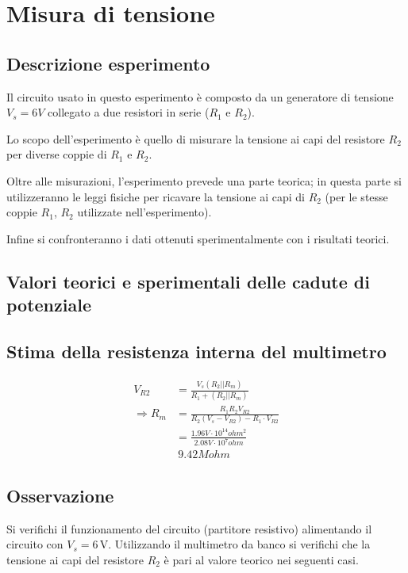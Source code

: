 \documentclass{article}
\begin{document}
\section{Misura di tensione}

\subsection{Descrizione esperimento}
Il circuito usato in questo esperimento è composto da un generatore di tensione \(V_s=6 V\)
collegato a due resistori in serie (\(R_1\) e \(R_2\)).

Lo scopo dell'esperimento è quello di misurare la tensione ai capi del resistore \(R_2\)
per diverse coppie di \(R_1\) e \(R_2\).

Oltre alle misurazioni, l'esperimento prevede una parte teorica; in questa parte si utilizzeranno le leggi fisiche per ricavare la tensione ai capi di \(R_2\) (per le stesse
coppie \(R_1\), \(R_2\) utilizzate nell'esperimento).

Infine si confronteranno i dati ottenuti sperimentalmente con i risultati teorici.
\subsection{Valori teorici e sperimentali delle cadute di potenziale}

\subsection{Stima della resistenza interna del multimetro}

\[
\begin{aligned}
    V_{R2}
    &= \frac{V_s (R_2 \lvert \rvert R_m)}{R_1 + (R_2 \lvert \rvert R_m)} \\
    \Rightarrow R_m 
    &= \frac{R_1 R_2 V_{R2}}{R_2(V_s-V_{R2}) -R_1 \cdot V_{R2}}\\
    &= \frac{1.96 V \cdot 10^{14} ohm ^2}{2.08 V \cdot 10^7 ohm}\\
    &~ 9.42 Mohm
\end{aligned}
\]

\subsection{Osservazione}

Si verifichi il funzionamento del circuito (partitore resistivo) alimentando il circuito con \( V_s = 6 \, \text{V} \).
Utilizzando il multimetro da banco si verifichi che la tensione ai capi del resistore \( R_2 \) è pari al valore teorico nei seguenti casi.
\end{document}

